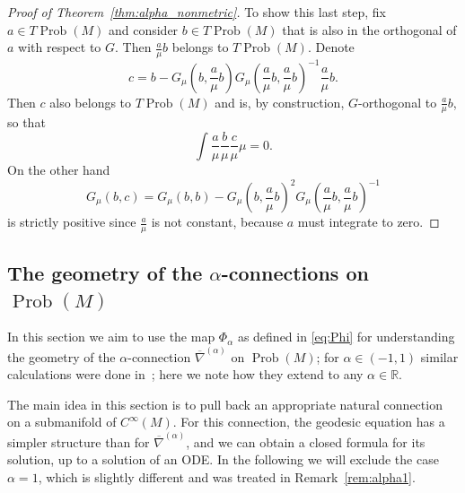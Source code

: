 \documentclass[11pt,reqno]{amsart}
\theoremstyle{definition}
\newcommand{\R}{\mathbb R}
\newcommand{\Prob}{\operatorname{Prob}(M)}
\newcommand{\GFR}{G}
\begin{document}
\begin{proof}[Proof of Theorem~\ref{thm:alpha_nonmetric}]
To show this last step, fix $a\in T\Prob$ and consider $b\in T\Prob$ that is also in the orthogonal of $a$ with respect to $\GFR$. Then $\frac{a}{\mu}b$ belongs to $T\Prob$. Denote
$$c=b-\GFR_\mu\left(b,\frac{a}{\mu}b\right)\GFR_\mu\left(\frac{a}{\mu}b,\frac{a}{\mu}b\right)^{-1}\frac{a}{\mu}b.$$
Then $c$ also belongs to $T\Prob$ and is, by construction, $\GFR$-orthogonal to $\frac{a}{\mu}b$, so that 
$$\int\frac{a}{\mu}\frac{b}{\mu}\frac{c}{\mu}\mu=0.$$
On the other hand
$$\GFR_{\mu}(b,c)=\GFR_{\mu}(b,b)-\GFR_{\mu}\left(b,\frac{a}{\mu}b\right)^2\GFR_{\mu}\left(\frac{a}{\mu}b,\frac{a}{\mu}b\right)^{-1}$$
is strictly positive since $\frac{a}{\mu}$ is not constant, because $a$ must integrate to zero.
\end{proof}

\subsection{The geometry of the $\alpha$-connections on $\Prob$}\label{sec:geometry_alpha}

In this section we aim to use the map $\Phi_{\alpha}$ as defined in \eqref{eq:Phi} for understanding the geometry of the $\alpha$-connection $\overline{\nabla}^{(\alpha)}$ on $\Prob$; 
for $\alpha\in (-1,1)$ similar calculations were done in~\cite{bauer2024p}; here we note how they extend to any $\alpha\in \R$.




The main idea in this section is to pull back an appropriate natural connection on a submanifold of $C^\infty(M)$. For this connection, the geodesic equation has a simpler structure than for $\overline{\nabla}^{(\alpha)}$, and we can obtain %
a closed formula for its solution, up to a solution of an ODE. In the following we will exclude the case $\alpha=1$, which is slightly different and was treated in Remark~\ref{rem:alpha1}.
\end{document}
